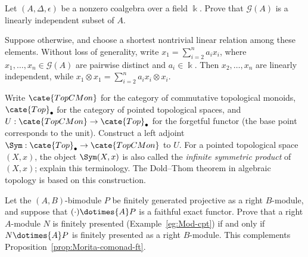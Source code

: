 	\item Let $(A,\Delta,\epsilon)$ be a nonzero coalgebra over a field
	$\Bbbk$. Prove that $\mathcal{G}(A)$ is a linearly independent subset of
	$A$.

	\begin{hint}
		Suppose otherwise, and choose a shortest nontrivial linear relation among
		these elements. Without loss of generality, write
		$x_1=\sum_{i=2}^n a_i x_i$, where
		$x_1,\ldots,x_n\in\mathcal{G}(A)$ are pairwise distinct and
		$a_i\in\Bbbk$. Then $x_2,\ldots,x_n$ are linearly independent, while
		$x_1\otimes x_1=\sum_{i=2}^n a_i x_i\otimes x_i$.
	\end{hint}

	\item Write $\cate{TopCMon}$ for the category of commutative topological
	monoids, $\cate{Top}_\bullet$ for the category of pointed topological
	spaces, and $U:\cate{TopCMon}\to\cate{Top}_\bullet$ for the forgetful
	functor (the base point corresponds to the unit). Construct a left adjoint
	$\Sym:\cate{Top}_\bullet\to\cate{TopCMon}$ to $U$. For a pointed
	topological space $(X,x)$, the object $\Sym(X,x)$ is also called the
	\emph{infinite symmetric product} of $(X,x)$; explain this terminology.
	The Dold--Thom theorem in algebraic topology is based on this construction.

	\item Let the $(A,B)$-bimodule $P$ be finitely generated projective as a
	right $B$-module, and suppose that $(\mathord\cdot)\dotimes{A}P$ is a
	faithful exact functor. Prove that a right $A$-module $N$ is finitely
	presented (Example~\ref{eg:Mod-cpt}) if and only if
	$N\dotimes{A}P$ is finitely presented as a right $B$-module. This
	complements Proposition~\ref{prop:Morita-comonad-ft}.

